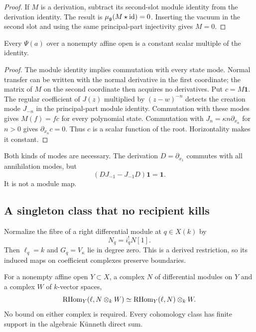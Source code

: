 \begin{proof}
If $M$ is a derivation, subtract its second-slot module identity
from the derivation identity.
The result is $\mu_{\mathfrak g}(M\star\mathrm{id})=0$.
Inserting the vacuum in the second slot and using the same
principal-part injectivity gives $M=0$.
\end{proof}

\begin{corollary}\label{cor:vol2-one-root-scalars}
Every $\Psi(a)$ over a nonempty affine open is a constant scalar
multiple of the identity.
\end{corollary}

\begin{proof}
The module identity implies commutation with every state mode.
Normal transfer can be written with the normal derivative in the
first coordinate; the matrix of $M$ on the second coordinate then
acquires no derivatives.
Put $c=M\mathbf1$. The regular coefficient of $J(z)$ multiplied by $(z-w)^{-n}$
detects the creation mode $J_{-n}$ in the principal-part module
identity. Commutation with these modes gives
$M(f)=fc$ for every polynomial state.
Commutation with $J_n=\kappa n\partial_{x_n}$ for $n>0$ gives
$\partial_{x_n}c=0$. Thus $c$ is a scalar function of the root.
Horizontality makes it constant.
\end{proof}

Both kinds of modes are necessary. The derivation
$D=\partial_{x_1}$ commutes with all annihilation modes, but
\[
 (DJ_{-1}-J_{-1}D)\mathbf1=\mathbf1.
\]
It is not a module map.

\subsection{A singleton class that no recipient kills}

Normalize the fibre of a right differential module at $q\in X(k)$ by
\[
 N_q=i_q^!N[1].
\]
Then $\ell_q=k$ and $G_q=V_\kappa$ lie in degree zero.
This is a derived restriction, so its induced maps on coefficient
complexes preserve boundaries.

\begin{lemma}\label{lem:vol2-affine-kunneth}
For a nonempty affine open $Y\subset X$, a complex $N$ of
differential modules on $Y$ and a complex $W$ of $k$-vector spaces,
\[
 \operatorname{RHom}_Y(\ell,N\otimes_kW)
 \simeq\operatorname{RHom}_Y(\ell,N)\otimes_kW.
\]
No bound on either complex is required. Every cohomology class
has finite support in the algebraic K\"unneth direct sum.
\end{lemma}

